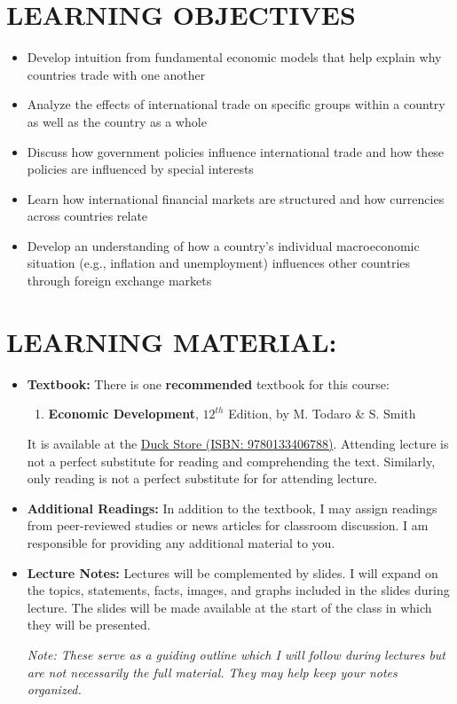 \documentclass[11pt]{article}
\begin{document}
\section*{LEARNING OBJECTIVES}
\begin{itemize}
    \item Develop intuition from fundamental economic models that help explain why countries trade with one another
    \item Analyze the effects of international trade on specific groups within a country as well as the country as a whole
    \item Discuss how government policies influence international trade and how these policies are influenced by special interests 
    \item Learn how international financial markets are structured and how currencies across countries relate
    \item Develop an understanding of how a country's individual macroeconomic situation (e.g., inflation and unemployment) influences other countries through foreign exchange markets
\end{itemize}

\section*{LEARNING MATERIAL:}
\begin{itemize}
    \item \textbf{Textbook:} There is one \textbf{recommended} textbook for this course:
        \begin{enumerate}
            \item \textbf{Economic Development}, $12^{th}$ Edition, by M. Todaro \& S. Smith
        \end{enumerate}
    It is available at the \href{https://www.uoduckstore.com/book-search-results?crn=11737&term=202501}{Duck Store (ISBN: 9780133406788)}.
    Attending lecture is not a perfect substitute for reading and comprehending the text. 
    Similarly, only reading is not a perfect substitute for for attending lecture. 
    \item \textbf{Additional Readings:} In addition to the textbook, I may assign readings from peer-reviewed studies or news articles for classroom discussion. 
    I am responsible for providing any additional material to you.
    \item \textbf{Lecture Notes:} Lectures will be complemented by slides.
    I will expand on the topics, statements, facts, images, and graphs included in the slides during lecture. 
    The slides will be made available at the start of the class in which they will be presented. 
    
    \emph{Note: These serve as a guiding outline which I will follow during lectures but are not necessarily the full material. They may help keep your notes organized.}
\end{itemize}
\end{document}
